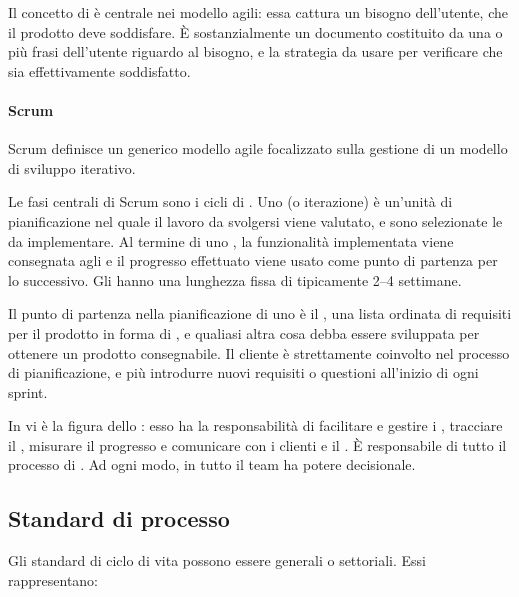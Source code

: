 Il concetto di  è centrale nei modello agili: essa
cattura un bisogno dell'utente, che il prodotto deve soddisfare. È
sostanzialmente un documento costituito da una o più frasi dell'utente riguardo
al bisogno, e la strategia da usare per verificare che sia effettivamente
soddisfatto.

\paragraph{Scrum}

Scrum definisce un generico modello agile focalizzato sulla gestione di un
modello di sviluppo iterativo.


Le fasi centrali di Scrum sono i cicli di . Uno
 (o iterazione) è un'unità di pianificazione nel quale il
lavoro da svolgersi viene valutato, e sono selezionate le  da
implementare. Al termine di uno , la funzionalità implementata
viene consegnata agli  e il progresso effettuato viene
usato come punto di partenza per lo  successivo. Gli
 hanno una lunghezza fissa di tipicamente 2--4 settimane.

Il punto di partenza nella pianificazione di uno  è il
, una lista ordinata di requisiti per il prodotto in
forma di ,  e qualiasi altra cosa debba
essere sviluppata per ottenere un prodotto consegnabile. Il cliente è
strettamente coinvolto nel processo di pianificazione, e più introdurre nuovi
requisiti o questioni all'inizio di ogni sprint.

In  vi è la figura dello : esso ha la
responsabilità di facilitare e gestire i , tracciare il
, misurare il progresso e comunicare con i clienti e il
. È responsabile di tutto il processo di .
Ad ogni modo, in  tutto il team ha potere decisionale.

\subsection{Standard di processo}

Gli standard di ciclo di vita possono essere generali o settoriali. Essi
rappresentano:

